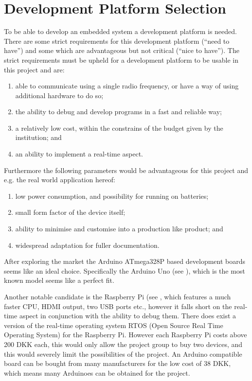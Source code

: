 
\section{Development Platform Selection}
To be able to develop an embedded system a development platform is needed. 
There are some strict requirements for this development platform (``need to have'') and some which are advantageous but not critical (``nice to have'').
The strict requirements must be upheld for a development platform to be usable in this project and are:

\begin{enumerate}[label=\itshape \alph*\upshape)]
\item able to communicate using a single radio frequency, or have a way of using additional hardware to do so;
\item the ability to debug and develop programs in a fast and reliable way;
\item a relatively low cost, within the constrains of the budget given by the institution;
and
\item an ability to implement a real-time aspect.
\end{enumerate}

Furthermore the following parameters would be advantageous for this project and e.g. the real world application hereof:
\begin{enumerate}[label=\itshape \alph*\upshape), resume]
\item low power consumption, and possibility for running on batteries;
\item small form factor of the device itself;
\item ability to minimise and customise into a production like product;
and
\item widespread adaptation for fuller documentation.
\end{enumerate}

\bigskip
After exploring the market the Arduino ATmega328P based development boards seems like an ideal choice.
Specifically the Arduino Uno (see \cite{ArduinoUNO}), which is the most known model seems like a perfect fit.

Another notable candidate is the Raspberry Pi (see \cite{RaspberryPI}, which features a much faster CPU, HDMI output, two USB ports etc., however it falls short on the real-time aspect in conjunction with the ability to debug them. 
There does exist a version of the real-time operating system RTOS (Open Source Real Time Operating System) for the Raspberry Pi.
However each Raspberry Pi costs above 200 DKK each, this would only allow the project group to buy two devices, and this would severely limit the possibilities of the project.
An Arduino compatible board can be bought from many manufacturers for the low cost of 38 DKK, which means many Arduinoes can be obtained for the project.

